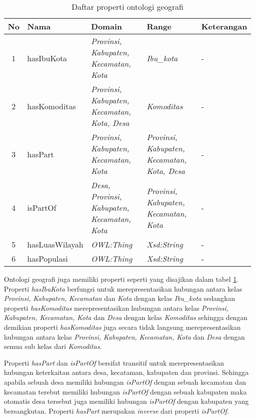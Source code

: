 \begin{table}[tb]
	\caption{Daftar properti ontologi geografi}
	\label{tab:ontogeo_property}
	\centering

	\begin{tabularx}{\textwidth}{|c|l|X|X|X|}
	\hline

	\hline
	\textbf{No} & \textbf{Nama} & \textbf{Domain} & \textbf{Range} & \textbf{Keterangan} \\
	\hline
		1 & hasIbuKota & \emph{Provinsi, Kabupaten, Kecamatan, Kota} & \emph{Ibu\_kota} & - \\
	\hline
		2 & hasKomoditas & \emph{Provinsi, Kabupaten, Kecamatan, Kota, Desa} & \emph{Komoditas} & - \\
	\hline
		3 & hasPart &\emph{Provinsi, Kabupaten, Kecamatan, Kota} & \emph{Provinsi, Kabupaten, Kecamatan, Kota, Desa} & - \\
	\hline
		4 & isPartOf & \emph{Desa, Provinsi, Kabupaten, Kecamatan, Kota} & \emph{Provinsi, Kabupaten, Kecamatan, Kota} & - \\
	\hline
		5 & hasLuasWilayah & \emph{OWL:Thing} & \emph{Xsd:String} & - \\
	\hline
		6 & hasPopulasi & \emph{OWL:Thing} & \emph{Xsd:String} & - \\
	\hline
	\end{tabularx}
\end{table}

Ontologi geografi juga memiliki properti seperti yang disajikan dalam tabel \ref{tab:ontogeo_property}. Properti \emph{hasIbuKota} berfungsi untuk merepresentasikan hubungan antara kelas \emph{Provinsi, Kabupaten, Kecamatan} dan \emph{Kota} dengan kelas \emph{Ibu\_kota} sedangkan properti \emph{hasKomoditas} merepresentasikan hubungan antara kelas \emph{Provinsi, Kabupaten, Kecamatan, Kota} dan \emph{Desa} dengan kelas \emph{Komoditas} sehingga dengan demikian properti \emph{hasKomoditas} juga secara tidak langsung merepresentasikan hubungan antara kelas \emph{Provinsi, Kabupaten, Kecamatan, Kota} dan \emph{Desa} dengan semua sub kelas dari \emph{Komoditas}.

Properti \emph{hasPart} dan \emph{isPartOf} bersifat transitif untuk merepresentasikan hubungan keterkaitan antara desa, kecataman, kabupaten dan provinsi. Sehingga apabila sebuah desa memiliki hubungan \emph{isPartOf} dengan sebuah kecamatan dan kecamatan terebut memiliki hubungan \emph{isPartOf} dengan sebuah kabupaten maka otomatis desa tersebut juga memiliki hubungan \emph{isPartOf} dengan kabupaten yang bersangkutan. Properti \emph{hasPart} merupakan \emph{inverse} dari properti \emph{isPartOf}.


